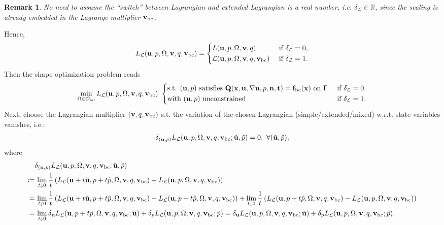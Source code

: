 \documentclass[oneside]{book}
\numberwithin{equation}{section}
\newtheorem{remark}{Remark}[section]
\begin{document}
\begin{remark}
    No need to assume the ``switch'' between Lagrangian and extended Lagrangian is a real number, i.e. $\delta_{\mathcal{L}}\in\mathbb{R}$, since the scaling is already embedded in the Lagrange multiplier ${\bf v}_{\rm bc}$.
\end{remark}
Hence,
\begin{equation*}
    L_{\mathcal{L}}({\bf u},p,\Omega,{\bf v},q,{\bf v}_{\rm bc}) = \left\{\begin{split}
        &L({\bf u},p,\Omega,{\bf v},q) &&\mbox{ if } \delta_{\mathcal{L}} = 0,\\
        &\mathcal{L}({\bf u},p,\Omega,{\bf v},q,{\bf v}_{\rm bc}) &&\mbox{ if } \delta_{\mathcal{L}} = 1.
    \end{split}\right.
\end{equation*}
Then the shape optimization problem reads
\begin{equation*}
    \min_{\Omega\in\mathcal{O}_{\rm ad}} L_{\mathcal{L}}({\bf u},p,\Omega,{\bf v},q,{\bf v}_{\rm bc})\ \left\{\begin{split}
        &\mbox{s.t. } ({\bf u},p) \mbox{ satisfies } {\bf Q}({\bf x},{\bf u},\nabla{\bf u},p,{\bf n},{\bf t}) = {\bf f}_{\rm bc}({\bf x}) \mbox{ on } \Gamma &&\mbox{ if } \delta_{\mathcal{L}} = 0,\\
        &\mbox{with } ({\bf u},p) \mbox{ unconstrained} &&\mbox{ if } \delta_{\mathcal{L}} = 1.
    \end{split}\right.
\end{equation*}
Next, choose the Lagrangian multiplier $({\bf v},q,{\bf v}_{\rm bc})$ s.t. the variation of the chosen Lagrangian (simple/extended/mixed) w.r.t. state variables vanishes, i.e.:
\begin{align*}
    \delta_{({\bf u},p)} L_{\mathcal{L}}({\bf u},p,\Omega,{\bf v},q,{\bf v}_{\rm bc};\tilde{\bf u},\tilde{p}) = 0,\ \forall(\tilde{\bf u},\tilde{p}),
\end{align*}
where
\begin{align*}
    &\delta_{({\bf u},p)} L_{\mathcal{L}}({\bf u},p,\Omega,{\bf v},q,{\bf v}_{\rm bc};\tilde{\bf u},\tilde{p})\\
   \coloneqq&\, \lim_{t\downarrow 0} \frac{1}{t}\left(L_{\mathcal{L}}({\bf u} + t\tilde{\bf u},p + t\tilde{p},\Omega,{\bf v},q,{\bf v}_{\rm bc}) - L_{\mathcal{L}}({\bf u},p,\Omega,{\bf v},q,{\bf v}_{\rm bc})\right)\\
    =&\, \lim_{t\downarrow 0} \frac{1}{t}\left(L_{\mathcal{L}}({\bf u} + t\tilde{\bf u},p + t\tilde{p},\Omega,{\bf v},q,{\bf v}_{\rm bc}) - L_{\mathcal{L}}({\bf u},p + t\tilde{p},\Omega,{\bf v},q,{\bf v}_{\rm bc})\right) + \lim_{t\downarrow 0} \frac{1}{t}\left(L_{\mathcal{L}}({\bf u},p + t\tilde{p},\Omega,{\bf v},q,{\bf v}_{\rm bc}) - L_{\mathcal{L}}({\bf u},p,\Omega,{\bf v},q,{\bf v}_{\rm bc})\right)\\
    =&\, \lim_{t\downarrow 0} \delta_{\bf u} L_{\mathcal{L}}({\bf u},p + t\tilde{p},\Omega,{\bf v},q,{\bf v}_{\rm bc};\tilde{\bf u}) + \delta_p L_{\mathcal{L}}({\bf u},p,\Omega,{\bf v},q,{\bf v}_{\rm bc};\tilde{p}) = \delta_{\bf u} L_{\mathcal{L}}({\bf u},p,\Omega,{\bf v},q,{\bf v}_{\rm bc};\tilde{\bf u}) + \delta_p L_{\mathcal{L}}({\bf u},p,\Omega,{\bf v},q,{\bf v}_{\rm bc};\tilde{p}).
\end{align*}
\end{document}
